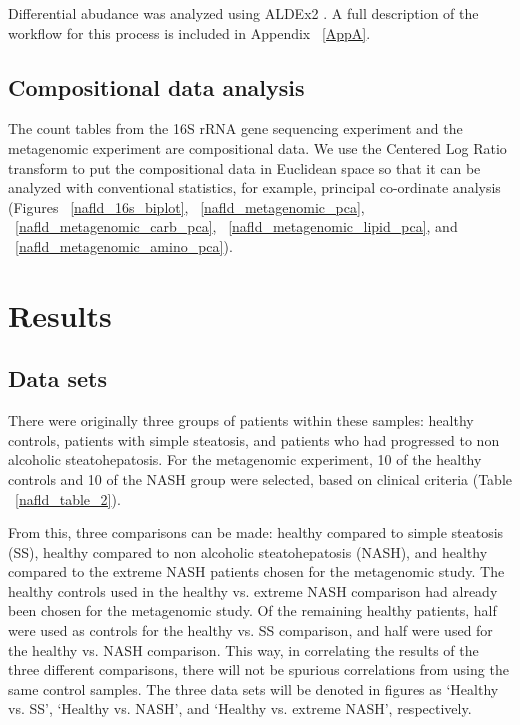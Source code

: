 Differential abudance was analyzed using ALDEx2 \cite{fernandes2014unifying}. A full description of the workflow for this process is included in Appendix ~\ref{AppA}.

\subsection{Compositional data analysis}

The count tables from the 16S rRNA gene sequencing experiment and the metagenomic experiment are compositional data. We use the Centered Log Ratio transform \cite{} to put the compositional data in Euclidean space so that it can be analyzed with conventional statistics, for example, principal co-ordinate analysis (Figures ~\ref{nafld_16s_biplot}, ~\ref{nafld_metagenomic_pca}, ~\ref{nafld_metagenomic_carb_pca}, ~\ref{nafld_metagenomic_lipid_pca}, and ~\ref{nafld_metagenomic_amino_pca}).

\FloatBarrier

\section{Results}

\subsection{Data sets}
There were originally three groups of patients within these samples: healthy controls, patients with simple steatosis, and patients who had progressed to non alcoholic steatohepatosis. For the metagenomic experiment, 10 of the healthy controls and 10 of the NASH group were selected, based on clinical criteria (Table ~\ref{nafld_table_2}).

From this, three comparisons can be made: healthy compared to simple steatosis (SS), healthy compared to non alcoholic steatohepatosis (NASH), and healthy compared to the extreme NASH patients chosen for the metagenomic study. The healthy controls used in the healthy vs. extreme NASH comparison had already been chosen for the metagenomic study. Of the remaining healthy patients, half were used as controls for the healthy vs. SS comparison, and half were used for the healthy vs. NASH comparison. This way, in correlating the results of the three different comparisons, there will not be spurious correlations from using the same control samples. The three data sets will be denoted in figures as `Healthy vs. SS', `Healthy vs. NASH', and `Healthy vs. extreme NASH', respectively.

